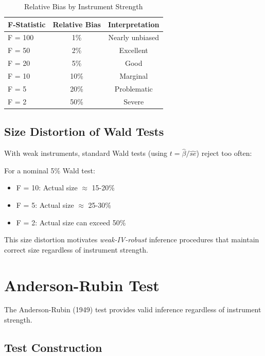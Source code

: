 \begin{table}[htbp]
\centering
\caption{Relative Bias by Instrument Strength}
\label{tab:relative_bias}
\begin{tabular}{lcc}
\toprule
F-Statistic & Relative Bias & Interpretation \\
\midrule
F = 100 & 1\% & Nearly unbiased \\
F = 50 & 2\% & Excellent \\
F = 20 & 5\% & Good \\
F = 10 & 10\% & Marginal \\
F = 5 & 20\% & Problematic \\
F = 2 & 50\% & Severe \\
\bottomrule
\end{tabular}
\end{table}

\subsection{Size Distortion of Wald Tests}

With weak instruments, standard Wald tests (using $t = \hat{\beta}/\hat{se}$) reject too often:

\begin{proposition}
\label{prop:size_distortion}
For a nominal 5\% Wald test:
\begin{itemize}
    \item F = 10: Actual size $\approx$ 15-20\%
    \item F = 5: Actual size $\approx$ 25-30\%
    \item F = 2: Actual size can exceed 50\%
\end{itemize}
\end{proposition}

This size distortion motivates \emph{weak-IV-robust} inference procedures that maintain correct size regardless of instrument strength.


\section{Anderson-Rubin Test}
\label{sec:ar_test}

The Anderson-Rubin (1949) test provides valid inference regardless of instrument strength.

\subsection{Test Construction}

